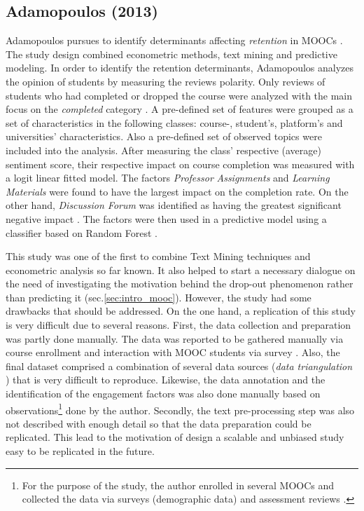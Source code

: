 \documentclass[
	a4paper,
	pdftex,
	12pt,	
	footinclude=true,
	fleqn,
	final,
	]{report}%
\begin{document}
\subsection{Adamopoulos (2013)}
\label{sec:adamp}
\vspace{-0.3cm}
Adamopoulos pursues to identify determinants affecting \emph{retention} in 
MOOCs \cite{Adamopoulos2013}. The study design combined 
econometric methods, text mining and predictive modeling. 
In order to identify the retention determinants, 
Adamopoulos analyzes the opinion of students 
by measuring the reviews polarity. 
Only reviews of students who had completed or dropped the 
course were analyzed with the main focus on the 
\emph{completed} category \cite{Adamopoulos2013}.
A pre-defined set of features were grouped as a set of characteristics in
the following classes: course-, student's, platform's and universities' 
characteristics. Also a pre-defined set of observed topics were
included into the analysis. After measuring the class' respective (average) 
sentiment score, their respective impact on course completion 
was measured with a logit linear fitted model. The factors \emph{Professor} 
\emph{Assignments} and \emph{Learning Materials} were found to have the largest impact
on the completion rate. On the other hand, \emph{Discussion Forum} was identified as 
having the greatest significant negative impact \cite{Adamopoulos2013}.
The factors were then used in a predictive model using a classifier based on
Random Forest \cite{Adamopoulos2013}.

This study was one of the first to combine Text Mining techniques and econometric 
analysis so far known. It also helped to start a necessary dialogue on the need of
investigating the motivation behind the drop-out phenomenon rather than predicting it (sec.\ref{sec:intro_mooc}). 
However, the study had some drawbacks that should be addressed.
On the one hand, a replication of this study is very difficult due to 
several reasons. First, the data collection and preparation was partly 
done manually. The data was reported to be gathered manually
via course enrollment and interaction with MOOC 
students via survey \cite{Adamopoulos2013}. Also, the final dataset comprised a 
combination of several data sources (\emph{data triangulation} \cite{Adamopoulos2013}) 
that is very difficult to reproduce. Likewise, the data annotation and the identification of the engagement 
factors was also done manually based on observations\footnote{For the purpose of the study, the author enrolled in several MOOCs and 
collected the data via surveys (demographic data) and assessment reviews \cite{Adamopoulos2013}.
} done by the author. Secondly, the text pre-processing step was also not 
described with enough detail so that the data preparation could be 
replicated. This lead to the motivation of design
a scalable and unbiased study easy to be replicated in the future.
\end{document}
